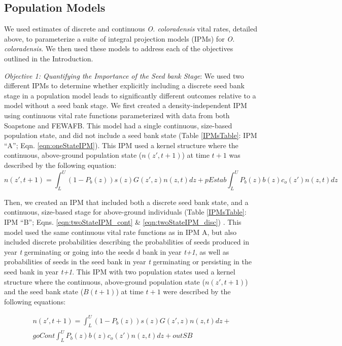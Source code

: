 \documentclass[12pt, letterpaper]{article}
\begin{document}
\subsection{Population Models}
We used estimates of discrete and continuous \textit{O. coloradensis} vital rates, detailed above, to parameterize a suite of integral projection models (IPMs) for \textit{O. coloradensis}. We then used these models to address each of the objectives outlined in the Introduction.

\textit{Objective 1: Quantifying the Importance of the Seed bank Stage}: We used two different IPMs to determine whether explicitly including a discrete seed bank stage in a population model leads to significantly different outcomes relative to a model without a seed bank stage. We first created a density-independent IPM using continuous vital rate functions parameterized with data from both Soapstone and FEWAFB. This model had a single continuous, size-based population state, and did not include a seed bank state (Table \ref{IPMsTable}: IPM “A”; Eqn. \ref{eqn:oneStateIPM}). This IPM used a kernel structure where the continuous, above-ground population state ($n(z', t+1)$) at time $t+1$ was described by the following equation:  
\begin{equation}\label{eqn:oneStateIPM} 
n(z', t+1) = \int_{L}^{U}(1-P_b(z))s(z)G(z',z)n(z,t)dz + pEstab\int_{L}^{U}P_b(z)b(z)c_o(z')n(z,t)dz
\end{equation}

Then, we created an IPM that included both a discrete seed bank state, and a continuous, size-based stage for above-ground individuals (Table \ref{IPMsTable}: IPM “B”; Eqns. \ref{eqn:twoStateIPM_cont} \& \ref{eqn:twoStateIPM_disc}) \cite{Ellner2006IntegralDemography, Rees2006, Paniw2017}. This model used the same continuous vital rate functions as in IPM A, but also included discrete probabilities describing the probabilities of seeds produced in year \textit{t} germinating or going into the seeds d bank in year \textit{t+1}, as well as probabilities of seeds in the seed bank in year \textit{t} germinating or persisting in the seed bank in year \textit{t+1}. This IPM with two population states used a kernel structure where the continuous, above-ground population state ($n(z',t+1)$) and the seed bank state ($B(t+1)$) at time $t+1$ were described by the following equations: 

\begin{equation}
\label{eqn:twoStateIPM_cont}
\begin{split}
n(z', t+1) = \int_{L}^{U}(1-P_b(z))s(z)G(z',z)n(z,t)dz + \\ goCont\int_{L}^{U}P_b(z)b(z)c_o(z')n(z,t)dz + outSB 
\end{split}
\end{equation}
\end{document}
